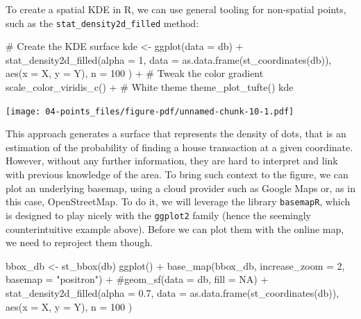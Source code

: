 \documentclass[
  letterpaper,
  DIV=11,
  numbers=noendperiod,
  oneside]{scrreprt}
\newenvironment{Shaded}{\begin{snugshade}}{\end{snugshade}}
\newcommand{\AttributeTok}[1]{\textcolor[rgb]{0.40,0.45,0.13}{#1}}
\newcommand{\CommentTok}[1]{\textcolor[rgb]{0.37,0.37,0.37}{#1}}
\newcommand{\DecValTok}[1]{\textcolor[rgb]{0.68,0.00,0.00}{#1}}
\newcommand{\FloatTok}[1]{\textcolor[rgb]{0.68,0.00,0.00}{#1}}
\newcommand{\FunctionTok}[1]{\textcolor[rgb]{0.28,0.35,0.67}{#1}}
\newcommand{\NormalTok}[1]{\textcolor[rgb]{0.00,0.23,0.31}{#1}}
\newcommand{\OtherTok}[1]{\textcolor[rgb]{0.00,0.23,0.31}{#1}}
\newcommand{\SpecialCharTok}[1]{\textcolor[rgb]{0.37,0.37,0.37}{#1}}
\newcommand{\StringTok}[1]{\textcolor[rgb]{0.13,0.47,0.30}{#1}}
\begin{document}
To create a spatial KDE in R, we can use general tooling for non-spatial
points, such as the \texttt{stat\_density2d\_filled} method:

\begin{Shaded}
\begin{Highlighting}[]
\CommentTok{\# Create the KDE surface}
\NormalTok{kde }\OtherTok{\textless{}{-}} \FunctionTok{ggplot}\NormalTok{(}\AttributeTok{data =}\NormalTok{ db) }\SpecialCharTok{+}
  \FunctionTok{stat\_density2d\_filled}\NormalTok{(}\AttributeTok{alpha =} \DecValTok{1}\NormalTok{,}
    \AttributeTok{data =} \FunctionTok{as.data.frame}\NormalTok{(}\FunctionTok{st\_coordinates}\NormalTok{(db)), }
    \FunctionTok{aes}\NormalTok{(}\AttributeTok{x =}\NormalTok{ X, }\AttributeTok{y =}\NormalTok{ Y),}
    \AttributeTok{n =} \DecValTok{100}
\NormalTok{  ) }\SpecialCharTok{+}
  \CommentTok{\# Tweak the color gradient}
  \FunctionTok{scale\_color\_viridis\_c}\NormalTok{() }\SpecialCharTok{+}
  \CommentTok{\# White theme}
  \FunctionTok{theme\_plot\_tufte}\NormalTok{() }
\NormalTok{kde}
\end{Highlighting}
\end{Shaded}

\texttt{[image: 04-points\_files/figure-pdf/unnamed-chunk-10-1.pdf]}

This approach generates a surface that represents the density of dots,
that is an estimation of the probability of finding a house transaction
at a given coordinate. However, without any further information, they
are hard to interpret and link with previous knowledge of the area. To
bring such context to the figure, we can plot an underlying basemap,
using a cloud provider such as Google Maps or, as in this case,
OpenStreetMap. To do it, we will leverage the library \texttt{basemapR},
which is designed to play nicely with the \texttt{ggplot2} family (hence
the seemingly counterintuitive example above). Before we can plot them
with the online map, we need to reproject them though.

\begin{Shaded}
\begin{Highlighting}[]
\NormalTok{bbox\_db }\OtherTok{\textless{}{-}} \FunctionTok{st\_bbox}\NormalTok{(db)}
\FunctionTok{ggplot}\NormalTok{() }\SpecialCharTok{+}
  \FunctionTok{base\_map}\NormalTok{(bbox\_db, }\AttributeTok{increase\_zoom =} \DecValTok{2}\NormalTok{, }\AttributeTok{basemap =} \StringTok{"positron"}\NormalTok{) }\SpecialCharTok{+}
  \CommentTok{\#geom\_sf(data = db, fill = NA) +}
  \FunctionTok{stat\_density2d\_filled}\NormalTok{(}\AttributeTok{alpha =} \FloatTok{0.7}\NormalTok{,}
    \AttributeTok{data =} \FunctionTok{as.data.frame}\NormalTok{(}\FunctionTok{st\_coordinates}\NormalTok{(db)), }
    \FunctionTok{aes}\NormalTok{(}\AttributeTok{x =}\NormalTok{ X, }\AttributeTok{y =}\NormalTok{ Y),}
    \AttributeTok{n =} \DecValTok{100}
\NormalTok{  )}
\end{Highlighting}
\end{Shaded}
\end{document}
